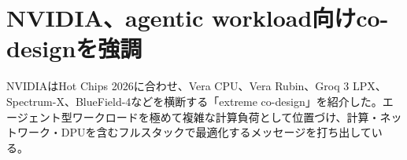 \section{NVIDIA、agentic workload向けco-designを強調}
NVIDIAはHot Chips 2026に合わせ、Vera CPU、Vera Rubin、Groq 3 LPX、Spectrum-X、BlueField-4などを横断する「extreme co-design」を紹介した。エージェント型ワークロードを極めて複雑な計算負荷として位置づけ、計算・ネットワーク・DPUを含むフルスタックで最適化するメッセージを打ち出している。
